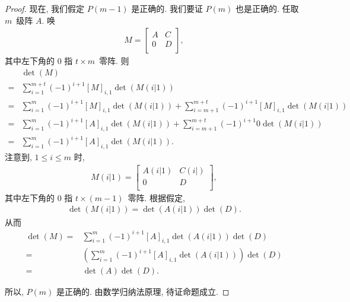 \documentclass[%
    UTF8,%
    fontset=none,%
    punct=kaiming,%
    zihao=-4,%
    a4paper,%
    oneside,%
]{ctexbook}
\renewcommand*{\leq}{\leqslant}
\begin{document}
\begin{proof}
    现在, 我们假定 \(P(m-1)\) 是正确的.
    我们要证 \(P(m)\) 也是正确的.
    任取 \(m\)~级阵 \(A\).
    唤
    \begin{align*}
        M = \begin{bmatrix}
                A & C \\
                0 & D \\
            \end{bmatrix},
    \end{align*}
    其中左下角的 \(0\) 指 \(t \times m\)~零阵.
    则
    \begin{align*}
             & \det {(M)}
        \\
        = {} & \sum_{i = 1}^{m+t}
        {(-1)^{i+1} [M]_{i,1} \det {(M(i|1))}}
        \\
        = {} & \sum_{i = 1}^{m}
        {(-1)^{i+1} [M]_{i,1} \det {(M(i|1))}}
        +
        \sum_{i = m+1}^{m+t}
        {(-1)^{i+1} [M]_{i,1} \det {(M(i|1))}}
        \\
        = {} & \sum_{i = 1}^{m}
        {(-1)^{i+1} [A]_{i,1} \det {(M(i|1))}}
        +
        \sum_{i = m+1}^{m+t}
        {(-1)^{i+1} 0 \det {(M(i|1))}}
        \\
        = {} & \sum_{i = 1}^{m}
        {(-1)^{i+1} [A]_{i,1} \det {(M(i|1))}}.
    \end{align*}
    注意到, \(1 \leq i \leq m\) 时,
    \begin{align*}
        M(i|1)
        = \begin{bmatrix}
              A(i|1) & C(i|) \\
              0      & D     \\
          \end{bmatrix},
    \end{align*}
    其中左下角的 \(0\) 指 \(t \times (m-1)\)~零阵.
    根据假定,
    \begin{align*}
        \det {(M(i|1))} = \det {(A(i|1))} \det {(D)}.
    \end{align*}
    从而
    \begin{align*}
        \det {(M)}
        = {} & \sum_{i = 1}^{m}
        {(-1)^{i+1} [A]_{i,1} \det {(A(i|1))} \det {(D)}}
        \\
        = {} & \left(\sum_{i = 1}^{m}
        {(-1)^{i+1} [A]_{i,1} \det {(A(i|1))}}\right)
        \det {(D)}
        \\
        = {} & \det {(A)} \det {(D)}.
    \end{align*}

    所以, \(P(m)\) 是正确的.
    由数学归纳法原理, 待证命题成立.
\end{proof}
\end{document}
